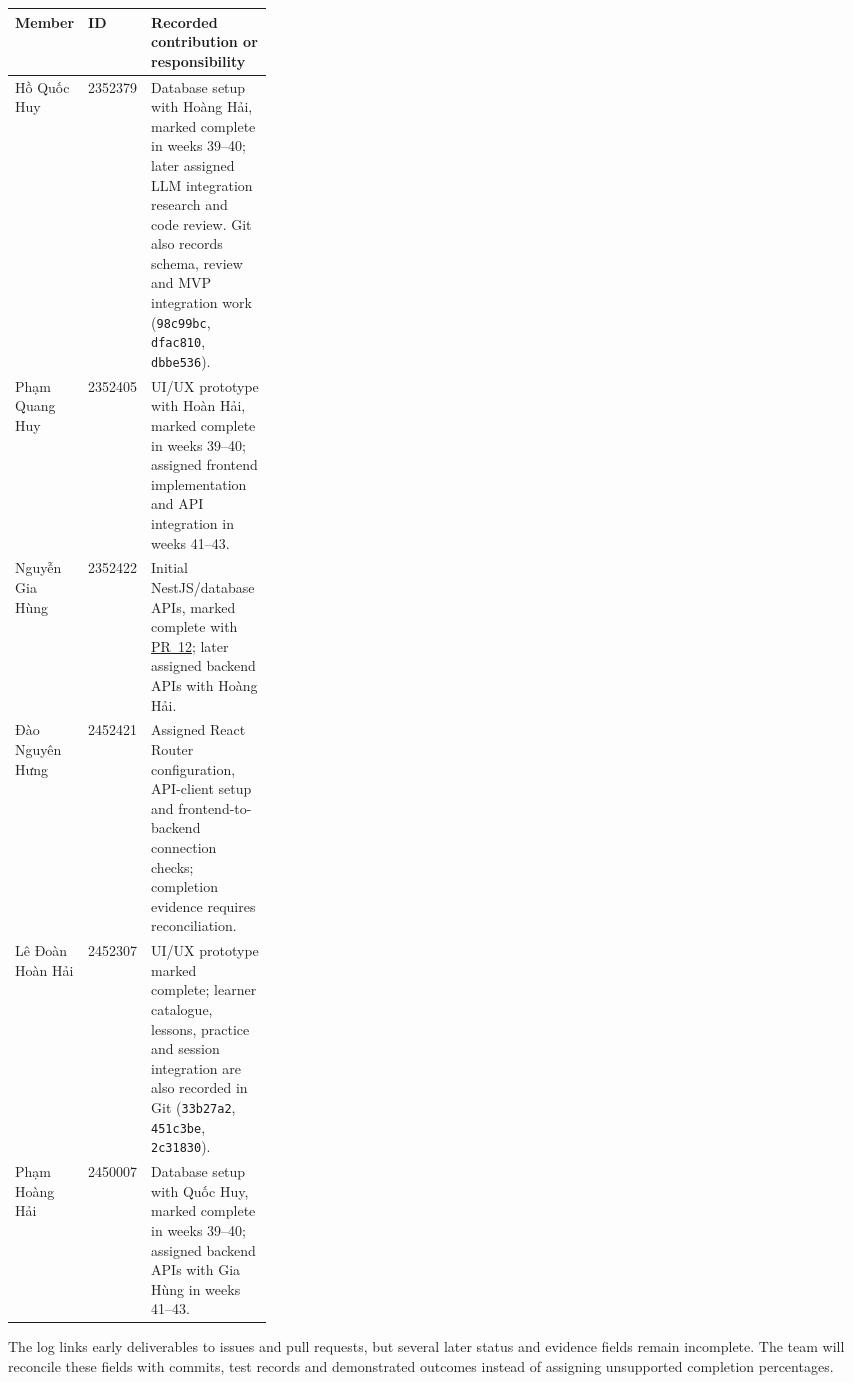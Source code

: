 \begin{center}
\begingroup
\small
\begin{tabularx}{\linewidth}{@{}p{0.19\linewidth}p{0.105\linewidth}X@{}}
\toprule
\textbf{Member} & \textbf{ID} & \textbf{Recorded contribution or responsibility} \\
\midrule
Hồ Quốc Huy & 2352379 & Database setup with Hoàng Hải, marked complete in weeks 39--40; later assigned LLM integration research and code review. Git also records schema, review and MVP integration work (\texttt{98c99bc}, \texttt{dfac810}, \texttt{dbbe536}). \\
Phạm Quang Huy & 2352405 & UI/UX prototype with Hoàn Hải, marked complete in weeks 39--40; assigned frontend implementation and API integration in weeks 41--43. \\
Nguyễn Gia Hùng & 2352422 & Initial NestJS/database APIs, marked complete with \href{https://github.com/huyho44/IELTS-Evaluator-Pro/pull/12}{PR~12}; later assigned backend APIs with Hoàng Hải. \\
Đào Nguyên Hưng & 2452421 & Assigned React Router configuration, API-client setup and frontend-to-backend connection checks; completion evidence requires reconciliation. \\
Lê Đoàn Hoàn Hải & 2452307 & UI/UX prototype marked complete; learner catalogue, lessons, practice and session integration are also recorded in Git (\texttt{33b27a2}, \texttt{451c3be}, \texttt{2c31830}). \\
Phạm Hoàng Hải & 2450007 & Database setup with Quốc Huy, marked complete in weeks 39--40; assigned backend APIs with Gia Hùng in weeks 41--43. \\
\bottomrule
\end{tabularx}
\endgroup
\end{center}

The log links early deliverables to issues and pull requests, but several
later status and evidence fields remain incomplete. The team will reconcile
these fields with commits, test records and demonstrated outcomes instead
of assigning unsupported completion percentages.

